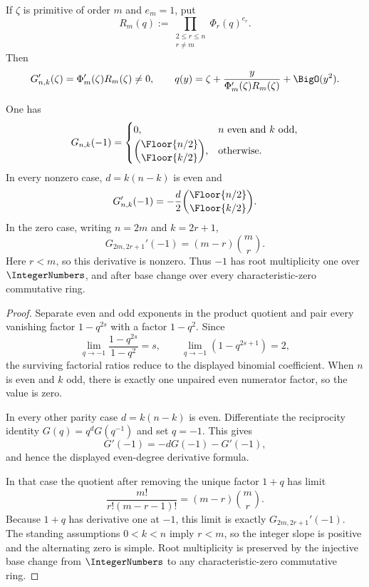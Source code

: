 If \(\zeta\) is primitive of order \(m\) and \(e_m=1\), put
\[
  R_m(q):=\prod_{\substack{2\le r\le n\\r\ne m}}\Phi_r(q)^{e_r}.
\]
Then
\[
  G_{n,k}'(\zeta)=\Phi_m'(\zeta)R_m(\zeta)\ne0,
  \qquad
  q(y)=\zeta+
  \frac{y}{\Phi_m'(\zeta)R_m(\zeta)}+\BigO(y^2).
\]

\begin{proposition}[Complete first jet at \(q=-1\)]
\label{prop:gq-minus-one}
One has
\[
  G_{n,k}(-1)=
  \begin{cases}
  0,&n\text{ even and }k\text{ odd},\\[0.25em]
  \displaystyle
  \binom{\Floor{n/2}}{\Floor{k/2}},
  &\text{otherwise}.
  \end{cases}
\]
In every nonzero case, \(d=k(n-k)\) is even and
\[
  G_{n,k}'(-1)
  =-\frac d2\binom{\Floor{n/2}}{\Floor{k/2}}.
\]
In the zero case, writing \(n=2m\) and \(k=2r+1\),
\[
  G_{2m,2r+1}'(-1)=(m-r)\binom mr.
\]
Here \(r<m\), so this derivative is nonzero.  Thus \(-1\) has root
multiplicity one over \(\IntegerNumbers\), and after base change over every
characteristic-zero commutative ring.
\end{proposition}

\begin{proof}
Separate even and odd exponents in the product quotient and pair every
vanishing factor \(1-q^{2s}\) with a factor \(1-q^2\).  Since
\[
  \lim_{q\to-1}\frac{1-q^{2s}}{1-q^2}=s,
  \qquad
  \lim_{q\to-1}(1-q^{2s+1})=2,
\]
the surviving factorial ratios reduce to the displayed binomial coefficient.
When \(n\) is even and \(k\) odd, there is exactly one unpaired even numerator
factor, so the value is zero.

In every other parity case \(d=k(n-k)\) is even.  Differentiate the
reciprocity identity \(G(q)=q^dG(q^{-1})\) and set \(q=-1\).  This gives
\[
  G'(-1)=-dG(-1)-G'(-1),
\]
and hence the displayed even-degree derivative formula.

In that case the quotient after removing the unique factor \(1+q\) has limit
\[
  \frac{m!}{r!(m-r-1)!}=(m-r)\binom mr.
\]
Because \(1+q\) has derivative one at \(-1\), this limit is exactly
\(G_{2m,2r+1}'(-1)\).  The standing assumptions \(0<k<n\) imply \(r<m\),
so the integer slope is positive and the alternating zero is simple.  Root
multiplicity is preserved by the injective base change from
\(\IntegerNumbers\) to any characteristic-zero commutative ring.
\end{proof}

